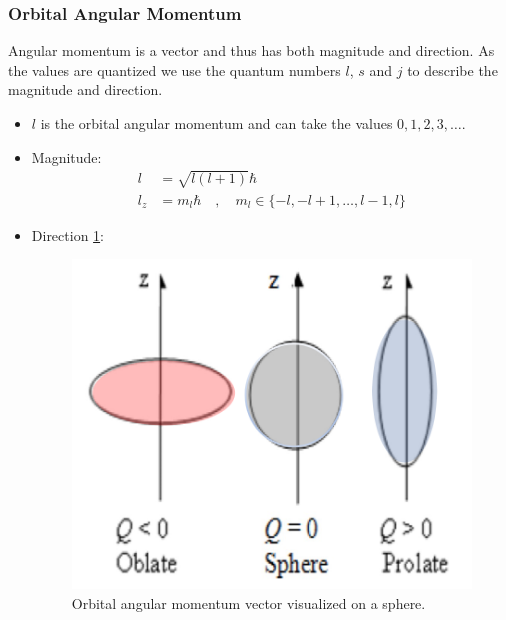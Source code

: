 \documentclass{article}
\begin{document}
\subsubsection{Orbital Angular Momentum}
Angular momentum is a vector and thus has both magnitude and direction. As the values are quantized we use the quantum numbers $l$, $s$ and $j$ to describe the magnitude and direction. 
\begin{itemize}
    \item $l$ is the orbital angular momentum and can take the values $0, 1, 2, 3, \ldots$.
    \item Magnitude: 
    \begin{align}
    l &= \sqrt{l(l+1)}ℏ \\
    l_z &= m_lℏ \quad , \quad m_l ∈ \{-l, -l+1, \ldots, l-1, l\} 
    \end{align} 
    \item Direction \cref{fig: angular_momentum_sphere}:
    \begin{figure}[h!]
        \centering
        \includegraphics[width = .75\textwidth]{angular_momentum_sphere.png}
        \caption{Orbital angular momentum vector visualized on a sphere.}
        \label{fig: angular_momentum_sphere}
    \end{figure}
\end{itemize}    
\end{document}
